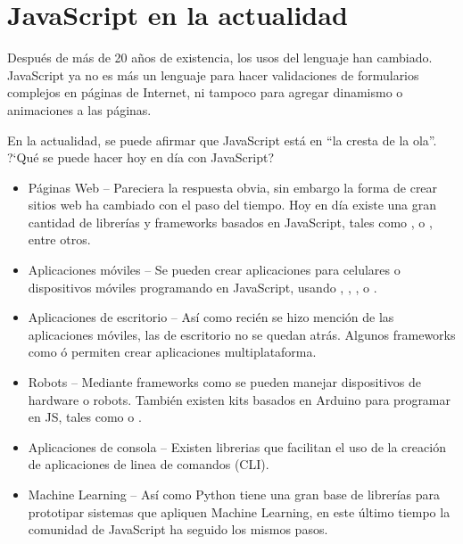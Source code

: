 
\section{JavaScript en la actualidad}

Después de más de 20 años de existencia, los usos del lenguaje han cambiado. JavaScript ya no es más un lenguaje para hacer validaciones de formularios complejos en páginas de Internet, ni tampoco para agregar dinamismo o animaciones a las páginas.

En la actualidad, se puede afirmar que JavaScript está en "`la cresta de la ola"'. ?`Qué se puede hacer hoy en día con JavaScript?

\begin{itemize}
	\item Páginas Web -- Pareciera la respuesta obvia, sin embargo la forma de crear sitios web ha cambiado con el paso del tiempo. Hoy en día existe una gran cantidad de librerías y frameworks basados en JavaScript, tales como ,  o , entre otros.
	\item Aplicaciones móviles -- Se pueden crear aplicaciones para celulares o dispositivos móviles programando en JavaScript, usando , , ,  o .
	\item Aplicaciones de escritorio -- Así como recién se hizo mención de las aplicaciones móviles, las de escritorio no se quedan atrás. Algunos frameworks como  ó  permiten crear aplicaciones multiplataforma.
	\item Robots -- Mediante frameworks como  se pueden manejar dispositivos de hardware o robots. También existen kits basados en Arduino para programar en JS, tales como  o .
	\item Aplicaciones de consola -- Existen librerias que facilitan el uso de la creación de aplicaciones de linea de comandos (CLI).
	\item Machine Learning -- Así como Python tiene una gran base de librerías para prototipar sistemas que apliquen Machine Learning, en este último tiempo la comunidad de JavaScript ha seguido los mismos pasos.
\end{itemize}



